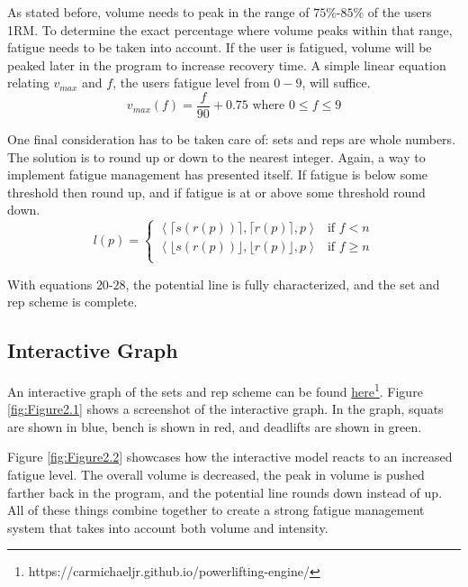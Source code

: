As stated before, volume needs to peak in the range of $75\%$-$85\%$ of the users 1RM. To determine the exact percentage where volume peaks within that range, fatigue needs to be taken into account. If the user is fatigued, volume will be peaked later in the program to increase recovery time. A simple linear equation relating $v_{max}$ and $f$, the users fatigue level from $0-9$, will suffice.
\begin{equation}
    v_{max}(f)=\frac{f}{90}+0.75 \text{ where }0\le f\le 9
\end{equation}

One final consideration has to be taken care of: sets and reps are whole numbers. The solution is to round up or down to the nearest integer. Again, a way to implement fatigue management has presented itself. If fatigue is below some threshold then round up, and if fatigue is at or above some threshold round down.
\begin{equation}
    l(p) =
    \begin{cases}
        \left<\lceil s(r(p))\rceil,\lceil r(p)\rceil,p\right> & \text{if $f<n$} \\
        \left<\lfloor s(r(p))\rfloor,\lfloor r(p)\rfloor,p\right> & \text{if $f\ge n$} \\
    \end{cases} 
\end{equation}


With equations $20$-$28$, the potential line is fully characterized, and the set and rep scheme is complete. 

\subsection{Interactive Graph}
An interactive graph of the sets and rep scheme can be found \href{https://carmichaeljr.github.io/powerlifting-engine/}{here\footnote{https://carmichaeljr.github.io/powerlifting-engine/}}. Figure \ref{fig:Figure2.1} shows a screenshot of the interactive graph. In the graph, squats are shown in blue, bench is shown in red, and deadlifts are shown in green.

Figure \ref{fig:Figure2.2} showcases how the interactive model reacts to an increased fatigue level. The overall volume is decreased, the peak in volume is pushed farther back in the program, and the potential line rounds down instead of up. All of these things combine together to create a strong fatigue management system that takes into account both volume and intensity.

